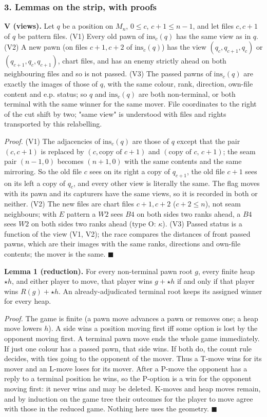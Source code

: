 \subsubsection*{3. Lemmas on the strip, with proofs}
\textbf{V (views).} Let $q$ be a position on $M_n$, $0\le c$, $c+1\le n-1$, and let files $c,c+1$ of $q$ be pattern files. (V1) Every old pawn of $\mathrm{ins}_c(q)$ has the same view as in $q$. (V2) A new pawn (on files $c+1,c+2$ of $\mathrm{ins}_c(q)$) has the view $(q_c,q_{c+1},q_c)$ or $(q_{c+1},q_c,q_{c+1})$, chart files, and has an enemy strictly ahead on both neighbouring files and so is not passed. (V3) The passed pawns of $\mathrm{ins}_c(q)$ are exactly the images of those of $q$, with the same colour, rank, direction, own-file content and e.p. status; so $q$ and $\mathrm{ins}_c(q)$ are both non-terminal, or both terminal with the same winner for the same mover. File coordinates to the right of the cut shift by two; "same view" is understood with files and rights transported by this relabelling.

\emph{Proof.} (V1) The adjacencies of $\mathrm{ins}_c(q)$ are those of $q$ except that the pair $(c,c+1)$ is replaced by $(c,\text{copy of }c+1)$ and $(\text{copy of }c,\,c+1)$; the seam pair $(n-1,0)$ becomes $(n+1,0)$ with the same contents and the same mirroring. So the old file $c$ sees on its right a copy of $q_{c+1}$, the old file $c+1$ sees on its left a copy of $q_c$, and every other view is literally the same. The flag moves with its pawn and its capturers have the same views, so it is recorded in both or neither. (V2) The new files are chart files $c+1,c+2$ ($c+2\le n$), not seam neighbours; with $E$ pattern a $W2$ sees $B4$ on both sides two ranks ahead, a $B4$ sees $W2$ on both sides two ranks ahead (type O: $\kappa$). (V3) Passed status is a function of the view (V1, V2); the race compares the distances of front passed pawns, which are their images with the same ranks, directions and own-file contents; the mover is the same. $\blacksquare$

\textbf{Lemma 1 (reduction).} For every non-terminal pawn root $g$, every finite heap $\star h$, and either player to move, that player wins $g+\star h$ if and only if that player wins $R(g)+\star h$. An already-adjudicated terminal root keeps its assigned winner for every heap.

\emph{Proof.} The game is finite (a pawn move advances a pawn or removes one; a heap move lowers $h$). A side wins a position moving first iff some option is lost by the opponent moving first. A terminal pawn move ends the whole game immediately. If just one colour has a passed pawn, that side wins. If both do, the count rule decides, with ties going to the opponent of the mover. Thus a T-move wins for its mover and an L-move loses for its mover. After a P-move the opponent has a reply to a terminal position he wins, so the P-option is a win for the opponent moving first: it never wins and may be deleted. K-moves and heap moves remain, and by induction on the game tree their outcomes for the player to move agree with those in the reduced game. Nothing here uses the geometry. $\blacksquare$


